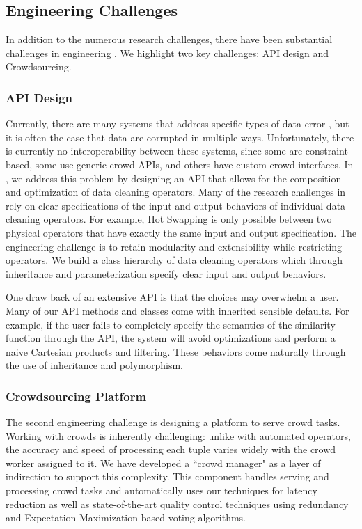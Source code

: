 \subsection{Engineering Challenges}
In addition to the numerous research challenges, there have been substantial challenges in engineering \sys.
We highlight two key challenges: API design and Crowdsourcing.

\subsubsection{API Design}
Currently, there are many systems that address specific types of data error \cite{gokhale2014corleone,park2014crowdfill,eracer,chen2014integrating}, but it is often 
the case that data are corrupted in multiple ways.
Unfortunately, there is currently no interoperability between these systems, since some are constraint-based, some use generic crowd APIs, and others have custom crowd interfaces.
In \sys, we address this problem by designing an API that allows for the composition and optimization of data cleaning operators.
Many of the research challenges in \sys rely on clear specifications of the input and output behaviors of
individual data cleaning operators.
For example, Hot Swapping is only possible between two physical operators that have exactly the same input and output specification.
The engineering challenge is to retain modularity and extensibility while restricting operators.
We build a class hierarchy of data cleaning operators which through inheritance and parameterization specify clear input and output behaviors.

One draw back of an extensive API is that the choices may overwhelm a user.
Many of our API methods and classes come with inherited sensible defaults.
For example, if the user fails to completely specify the semantics of the similarity function through the API, 
the system will avoid optimizations and perform a naive Cartesian products and filtering.
These behaviors come naturally through the use of inheritance and polymorphism.

\subsubsection{Crowdsourcing Platform}
The second engineering challenge is designing a platform to serve crowd tasks.
Working with crowds is inherently challenging: unlike with automated operators, the accuracy and speed of processing each tuple varies widely with the crowd worker assigned to it.
We have developed a ``crowd manager" as a layer of indirection to support this complexity.
This component handles serving and processing crowd tasks and automatically uses our techniques for latency reduction as well as state-of-the-art quality control techniques using redundancy and Expectation-Maximization based voting algorithms.

